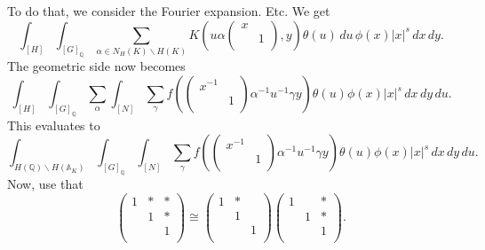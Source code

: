 \documentclass[reqno]{amsart} 
\begin{document}
To do that, we consider the Fourier expansion.  Etc.  We get
\begin{equation*}
  \int_{[H]}
  \int_{[G]_{\mathbb{Q}}}
  \sum_{\alpha \in N_H(K) \backslash H(K) }
  K \left(
    u \alpha 
    \begin{pmatrix}
      x      &  \\
             & 1 \\
    \end{pmatrix}
    , y\right)
  \theta(u) \, d u
  \, \phi(x) \lvert x \rvert^s \, d x \,d y.
\end{equation*}
The geometric side now becomes
\begin{equation*}
  \int_{[H]} \int_{[G]_{\mathbb{Q}}} \sum_\alpha
  \int_{[N]}
  \sum_\gamma f \left(
    \begin{pmatrix}
      x^{-1}      &  \\
                  & 1 \\
    \end{pmatrix} \alpha^{-1} u^{-1} \gamma y \right)
  \theta(u) \phi(x) \lvert x \rvert^s \,d x \,d y \,d u.
\end{equation*}
This evaluates to
\begin{equation*}
  \int_{H(\mathbb{Q}) \backslash H(\mathbb{A}_K)}
  \int_{[G]_{\mathbb{Q}}}
  \int_{[N]}
  \sum_\gamma
  f \left(
    \begin{pmatrix}
      x^{-1}      &  \\
                  & 1 \\
    \end{pmatrix} \alpha^{-1} u^{-1} \gamma y \right)
  \theta(u) \phi(x) \lvert x \rvert^s \,d x \,d y \,d u.
\end{equation*}
Now, use that
\begin{equation*}
  \begin{pmatrix}
    1    & \ast & \ast \\
             & 1 & \ast \\
             &  & 1 \\
  \end{pmatrix}
  \cong
  \begin{pmatrix}
    1    & \ast &  \\
         & 1 &  \\
         &  & 1 \\
  \end{pmatrix}
  \begin{pmatrix}
    1    &  & \ast \\
         & 1 & \ast \\
         &  & 1 \\
  \end{pmatrix}.
\end{equation*}
\end{document}
